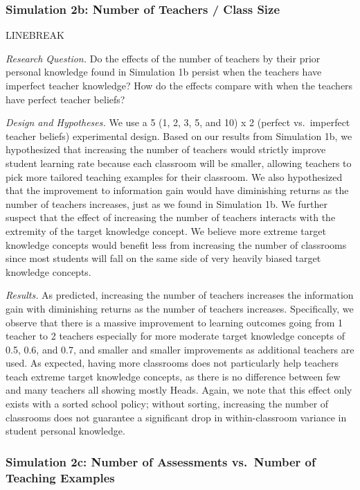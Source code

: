 \documentclass[10pt, letterpaper]{article}
\begin{document}
\subsubsection{Simulation 2b: Number of Teachers / Class
Size}\label{simulation-2b-number-of-teachers-class-size-1}

LINEBREAK

\emph{Research Question. } Do the effects of the number of teachers by
their prior personal knowledge found in Simulation 1b persist when the
teachers have imperfect teacher knowledge? How do the effects compare
with when the teachers have perfect teacher beliefs?

\emph{Design and Hypotheses. } We use a 5 (1, 2, 3, 5, and 10) x 2
(perfect vs.~imperfect teacher beliefs) experimental design. Based on
our results from Simulation 1b, we hypothesized that increasing the
number of teachers would strictly improve student learning rate because
each classroom will be smaller, allowing teachers to pick more tailored
teaching examples for their classroom. We also hypothesized that the
improvement to information gain would have diminishing returns as the
number of teachers increases, just as we found in Simulation 1b. We
further suspect that the effect of increasing the number of teachers
interacts with the extremity of the target knowledge concept. We believe
more extreme target knowledge concepts would benefit less from
increasing the number of classrooms since most students will fall on the
same side of very heavily biased target knowledge concepts.

\emph{Results. } As predicted, increasing the number of teachers
increases the information gain with diminishing returns as the number of
teachers increases. Specifically, we observe that there is a massive
improvement to learning outcomes going from 1 teacher to 2 teachers
especially for more moderate target knowledge concepts of 0.5, 0.6, and
0.7, and smaller and smaller improvements as additional teachers are
used. As expected, having more classrooms does not particularly help
teachers teach extreme target knowledge concepts, as there is no
difference between few and many teachers all showing mostly Heads.
Again, we note that this effect only exists with a sorted school policy;
without sorting, increasing the number of classrooms does not guarantee
a significant drop in within-classroom variance in student personal
knowledge.

\subsubsection{Simulation 2c: Number of Assessments vs.~Number of
Teaching
Examples}\label{simulation-2c-number-of-assessments-vs.number-of-teaching-examples}
\end{document}
